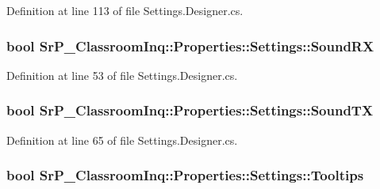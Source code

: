 \-Definition at line 113 of file \-Settings.\-Designer.\-cs.

\hypertarget{class_sr_p___classroom_inq_1_1_properties_1_1_settings_ab0ec9af30232e0f23083548e3b7242a2}{
\subsubsection[{\-Sound\-R\-X}]{\setlength{\rightskip}{0pt plus 5cm}bool \-Sr\-P\-\_\-\-Classroom\-Inq\-::\-Properties\-::\-Settings\-::\-Sound\-R\-X}}
\label{class_sr_p___classroom_inq_1_1_properties_1_1_settings_ab0ec9af30232e0f23083548e3b7242a2}


\-Definition at line 53 of file \-Settings.\-Designer.\-cs.

\hypertarget{class_sr_p___classroom_inq_1_1_properties_1_1_settings_a0baa5402bcfc0c013d2c43fd95adc7e2}{
\subsubsection[{\-Sound\-T\-X}]{\setlength{\rightskip}{0pt plus 5cm}bool \-Sr\-P\-\_\-\-Classroom\-Inq\-::\-Properties\-::\-Settings\-::\-Sound\-T\-X}}
\label{class_sr_p___classroom_inq_1_1_properties_1_1_settings_a0baa5402bcfc0c013d2c43fd95adc7e2}


\-Definition at line 65 of file \-Settings.\-Designer.\-cs.

\hypertarget{class_sr_p___classroom_inq_1_1_properties_1_1_settings_a321180f5ee03a2226b34422de41e201a}{
\subsubsection[{\-Tooltips}]{\setlength{\rightskip}{0pt plus 5cm}bool \-Sr\-P\-\_\-\-Classroom\-Inq\-::\-Properties\-::\-Settings\-::\-Tooltips}}
\label{class_sr_p___classroom_inq_1_1_properties_1_1_settings_a321180f5ee03a2226b34422de41e201a}


